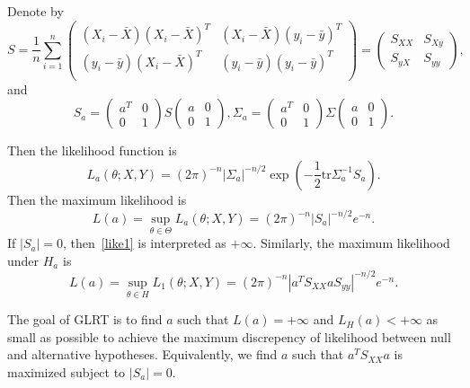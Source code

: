 \documentclass[review]{elsarticle}
\theoremstyle{plain}
\theoremstyle{definition}
\theoremstyle{remark}
\begin{document}
Denote by
\begin{equation}
    S=\frac{1}{n}\sum_{i=1}^n \begin{pmatrix}
        (X_i-\bar{X}){(X_i-\bar{X})}^T&(X_i-\bar{X}){(y_i-\bar{y})}^T\\
        (y_i-\bar{y}){(X_i-\bar{X})}^T&(y_i-\bar{y}){(y_i-\bar{y})}^T\\
        \end{pmatrix}=\begin{pmatrix}S_{XX} & S_{Xy} \\ S_{yX}& S_{yy}\end{pmatrix},
\end{equation}
and
\begin{equation}
    S_a=\begin{pmatrix}
        a^T& 0\\
        0& 1
    \end{pmatrix}
    S\begin{pmatrix}
        a& 0\\
        0& 1
    \end{pmatrix},
    \Sigma_a=\begin{pmatrix}
        a^T& 0\\
        0& 1
    \end{pmatrix}
    \Sigma\begin{pmatrix}
        a& 0\\
        0& 1
    \end{pmatrix}.
\end{equation}


Then the likelihood function is 
\begin{equation}
L_a(\theta;X,Y)={(2\pi)}^{-n}|\Sigma_a|^{-n/2}\exp{(-\frac{1}{2}\textrm{tr}\Sigma_a^{-1}S_a)}.
\end{equation}
Then the maximum likelihood is
    \begin{equation}\label{like1}
        L(a)=\sup_{\theta\in \Theta}L_a(\theta ;X,Y)={(2\pi)}^{-n} |S_a|^{-n/2}e^{-n}.
\end{equation}
    If $|S_a|=0$, then~\ref{like1} is interpreted as $+\infty$.
    Similarly, the maximum likelihood under $H_a$ is
\begin{equation}
    L(a)=\sup_{\theta\in H}L_1(\theta ;X,Y)={(2\pi)}^{-n} |a^T S_{XX}aS_{yy}|^{-n/2}e^{-n}.
\end{equation}

    The goal of GLRT is to find $a$ such that $L(a)=+\infty$ and $L_{H}(a)<+\infty$ as small as possible to achieve the maximum discrepency of likelihood between null and alternative hypotheses. Equivalently, we find $a$ such that $a^T S_{XX} a$ is maximized subject to $|S_a|=0$.
\end{document}
